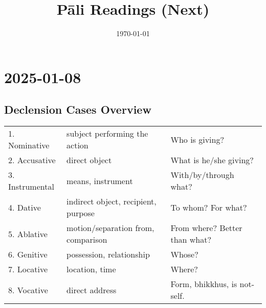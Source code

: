 \documentclass[11pt,oneside]{memoir}
\date{\today}
\title{Pāli Readings (Next)}
\begin{document}
\maketitle
\makeatletter

\newlength{\colOne}\setlength{\colOne}{0.35\linewidth}
\newlength{\colTwo}\setlength{\colTwo}{0.6\linewidth}

\renewenvironment{quote}%
{\list{}{%
    \doubleLineSize
    \listparindent 0pt
    \itemindent    0pt
    \leftmargin    3em
    \rightmargin   3em
    \parsep        0pt
    \topsep        8pt
    \partopsep     0pt}%
\item[] \raggedright}%
{\endlist}

\renewcommand*\sentenceDiaSolution[2][0.4]{%
  \ifanswerkey%
    \hspace*{-\spinemargin}%
    \begin{minipage}{\paperwidth}%
      \centering%
      \texttt{[image: \#2]}%
    \end{minipage}%
  \fi%
}

\makeatother

\mainmatter

\chapter{2025-01-08}
\label{sec:orgcb51f02}
\section{Declension Cases Overview}
\label{sec:org053b1e2}

\begin{tabular}{lll}
1. Nominative & subject performing the action & Who is giving?\\[0pt]
2. Accusative & direct object & What is he/she giving?\\[0pt]
3. Instrumental & means, instrument & With/by/through what?\\[0pt]
4. Dative & indirect object, recipient, purpose & To whom? For what?\\[0pt]
5. Ablative & motion/separation from, comparison & From where? Better than what?\\[0pt]
6. Genitive & possession, relationship & Whose?\\[0pt]
7. Locative & location, time & Where?\\[0pt]
8. Vocative & direct address & Form, bhikkhus, is not-self.\\[0pt]
\end{tabular}
\end{document}
